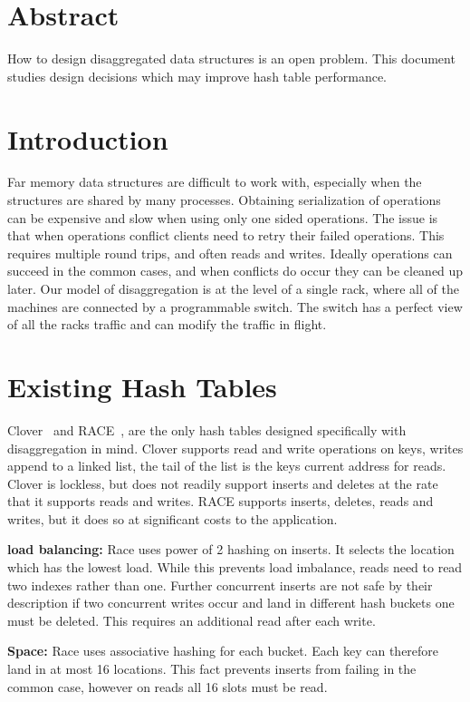 \section{Abstract}

How to design disaggregated data structures is an open problem. This document
studies design decisions which may improve hash table performance.

\section{Introduction}

Far memory data structures are difficult to work with, especially when the
structures are shared by many processes. Obtaining serialization of operations
can be expensive and slow when using only one sided operations. The issue is
that when operations conflict clients need to retry their failed operations.
This requires multiple round trips, and often reads and writes. Ideally
operations can succeed in the common cases, and when conflicts do occur they can
be cleaned up later. Our model of disaggregation is at the level of a single
rack, where all of the machines are connected by a programmable switch. The
switch has a perfect view of all the racks traffic and can modify the traffic in
flight.

\section{Existing Hash Tables}

Clover~\cite{clover} and RACE~\cite{race}, are the only hash tables designed
specifically with disaggregation in mind. Clover supports read and write
operations on keys, writes append to a linked list, the tail of the list is the
keys current address for reads. Clover is lockless, but does not readily support
inserts and deletes at the rate that it supports reads and writes. RACE supports
inserts, deletes, reads and writes, but it does so at significant costs to the
application.

\textbf{load balancing:} Race uses power of 2 hashing on inserts. It selects the
location which has the lowest load. While this prevents load imbalance, reads
need to read two indexes rather than one. Further concurrent inserts are not
safe by their description if two concurrent writes occur and land in different
hash buckets one must be deleted. This requires an additional read after each write.

\textbf{Space:} Race uses associative hashing for each bucket. Each key can
therefore land in at most 16 locations. This fact prevents inserts from failing
in the common case, however on reads all 16 slots must be read.

